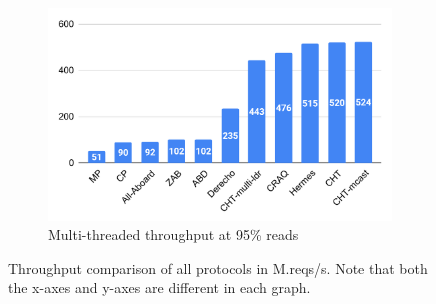 \begin{figure}[t]
\begin{subfigure}[b]{0.33\textwidth}
    \includegraphics[width=\textwidth]{1_figures/5perc-writes.pdf}
    \caption{Multi-threaded throughput at 95\% reads}
  \label{fig:5perc}
  \end{subfigure}
  \caption{Throughput comparison of all protocols in M.reqs/s. Note that both the x-axes and y-axes are different in each graph.}
  \label{fig:three-bars}
\end{figure}
